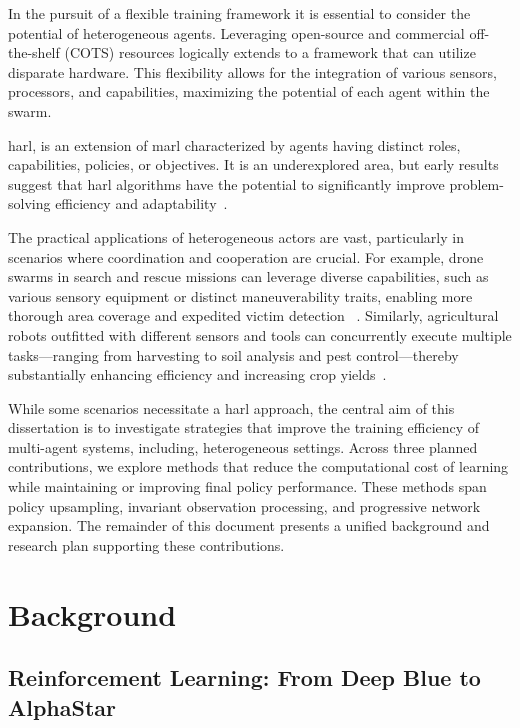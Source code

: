 In the pursuit of a flexible training framework
it is essential to consider the potential of heterogeneous agents. 
Leveraging open-source and commercial off-the-shelf (COTS) resources 
logically extends to a framework that can utilize disparate hardware. 
This flexibility allows for the integration of various sensors, processors, 
and capabilities, maximizing the potential of each agent within the swarm. 

\Gls{harl}, is an extension of \gls{marl} characterized by agents having 
distinct roles, capabilities, policies, or objectives. It is an 
underexplored area, but early results suggest that \gls{harl} algorithms
have the potential to significantly improve problem-solving efficiency 
and adaptability~\cite{calvo2018}.

The practical applications of heterogeneous actors are vast, particularly in 
scenarios where coordination and cooperation are crucial. For example, 
drone swarms in search and rescue missions can leverage diverse capabilities, 
such as various sensory equipment or distinct maneuverability traits, 
enabling more thorough area coverage and expedited victim detection
~\cite{hoang2023,kouzeghar2023}.
Similarly, agricultural robots outfitted with different sensors and tools can 
concurrently execute multiple tasks—ranging from harvesting to soil analysis and
pest control—thereby substantially enhancing efficiency and increasing crop 
yields~\cite{carbone2018,amarasinghe2019}.

While some scenarios necessitate a \gls{harl} approach, the central aim of 
this dissertation is to investigate strategies that improve the training 
efficiency of multi-agent systems, including, heterogeneous settings. 
Across three planned contributions, we explore methods that reduce the 
computational cost of learning while maintaining or improving final policy 
performance. These methods span policy upsampling, invariant observation processing, 
and progressive network expansion. The remainder of this document 
presents a unified background and research plan supporting these contributions.


\section{Background}%
\label{sec:background}

    \subsection*{Reinforcement Learning: From Deep Blue to AlphaStar}%

